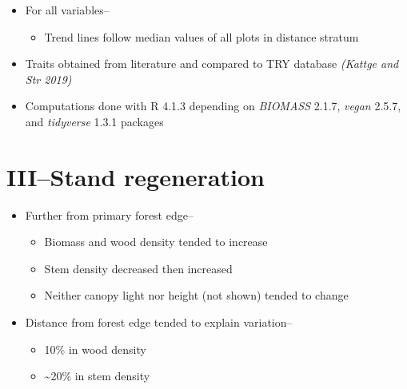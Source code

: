 \documentclass[
]{article}
\providecommand{\tightlist}{%
  \setlength{\itemsep}{0pt}\setlength{\parskip}{0pt}}
\begin{document}
\begin{itemize}
\item
  For all variables--

  \begin{itemize}
  \tightlist
  \item
    Trend lines follow median values of all plots in distance stratum
  \end{itemize}
\item
  Traits obtained from literature and compared to TRY database
  \emph{(Kattge and Str 2019)}
\item
  Computations done with R 4.1.3 depending on \emph{BIOMASS} 2.1.7,
  \emph{vegan} 2.5.7, and \emph{tidyverse} 1.3.1 packages
\end{itemize}

\hypertarget{iiistand-regeneration}{%
\section{III--Stand regeneration}\label{iiistand-regeneration}}

\begin{itemize}
\item
  Further from primary forest edge--

  \begin{itemize}
  \item
    Biomass and wood density tended to increase
  \item
    Stem density decreased then increased
  \item
    Neither canopy light nor height (not shown) tended to change
  \end{itemize}
\item
  Distance from forest edge tended to explain variation--

  \begin{itemize}
  \item
    10\% in wood density
  \item
    \textasciitilde20\% in stem density
  \end{itemize}
\end{itemize}
\end{document}
